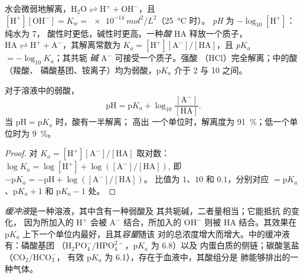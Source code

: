 \begin{definition}[pH、酸、碱、p$K_a$]\label{def:b1:water-small-molecules:ph}
水会微弱地解离，$\mathrm{H_2O} \rightleftharpoons
\mathrm{H^+} + \mathrm{OH^-}$，且 $[\mathrm{H^+}][\mathrm{OH^-}] =
K_w = \qty{e-14}{mol^2/L^2}$（\qty{25}{\celsius} 时）。
\emph{pH} 为 $-\log_{10}[\mathrm{H^+}]$：纯水为 7，
酸性时更低，碱性时更高。一种\emph{酸} $\mathrm{HA}$
释放一个质子，$\mathrm{HA} \rightleftharpoons \mathrm{H^+} +
\mathrm{A^-}$，其解离常数为 $K_a =
[\mathrm{H^+}][\mathrm{A^-}]/[\mathrm{HA}]$，且
\emph{p$K_a$} $= -\log_{10}K_a$；其共轭
\emph{碱} $\mathrm{A^-}$ 可接受一个质子。强酸
（HCl）完全解离；中的酸（羧酸、
磷酸基团、铵离子）均为弱酸，p$K_a$ 介于 2 与 10 之间。
\end{definition}

\begin{theorem}\label{thm:b1:water-small-molecules:hh}
对于溶液中的弱酸，
\[
\mathrm{pH} = \mathrm{p}K_a + \log_{10}\frac{[\mathrm{A^-}]}{[\mathrm{HA}]} .
\]
当 $\mathrm{pH} = \mathrm{p}K_a$ 时，酸有一半解离； 高出
一个单位时，解离度为 \qty{91}{\%}；低一个单位时为 \qty{9}{\%}。
\end{theorem}
\begin{proof}
对 $K_a = [\mathrm{H^+}][\mathrm{A^-}]/[\mathrm{HA}]$ 取对数：
$\log K_a = \log[\mathrm{H^+}] + \log([\mathrm{A^-}]/[\mathrm{HA}])$,
即 $-\mathrm{p}K_a = -\mathrm{pH} + \log([\mathrm{A^-}]/[\mathrm{HA}])$。
比值为 $1$、$10$ 和 $0.1$，分别对应  $= \mathrm{p}K_a$、$\mathrm{p}K_a + 1$
和 $\mathrm{p}K_a - 1$ 处。
\end{proof}

\begin{definition}[缓冲液]\label{def:b1:water-small-molecules:buffer}
\emph{缓冲液}是一种溶液，其中含有一种弱酸及
其共轭碱，二者量相当；它能抵抗  的变化，
因为所加入的 $\mathrm{H^+}$ 会被 $\mathrm{A^-}$ 结合，所加入的
$\mathrm{OH^-}$ 则被 $\mathrm{HA}$ 结合。其效果在
p$K_a$ 上下一个单位内最好，且其\emph{容量}随该
对的总浓度增大而增大。中的缓冲液有：磷酸基团
（$\mathrm{H_2PO_4^-}/\mathrm{HPO_4^{2-}}$，p$K_a$ 为 6.8）以及
内蛋白质的侧链；碳酸氢盐（$\mathrm{CO_2}/\mathrm{HCO_3^-}$，
有效 p$K_a$ 为 6.1），存在于血液中，其酸组分是
肺能够排出的一种气体。
\end{definition}

